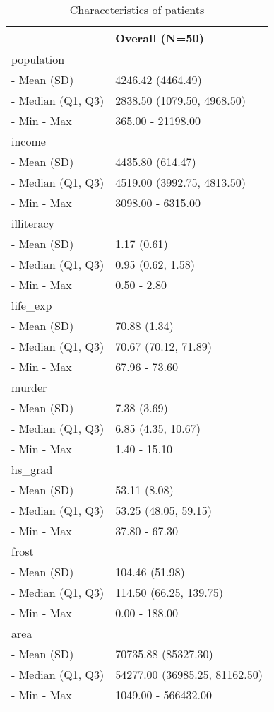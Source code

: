 \documentclass[]{article}
\begin{document}
\begin{table}[!h]

\caption{\label{tab:unnamed-chunk-2}Characcteristics of patients}
\centering
\begin{tabular}[t]{l|l}
\hline
 & Overall (N=50)\\
\hline
population & \\
\hline
-  Mean (SD) & 4246.42 (4464.49)\\
\hline
-  Median (Q1, Q3) & 2838.50 (1079.50, 4968.50)\\
\hline
-  Min - Max & 365.00 - 21198.00\\
\hline
income & \\
\hline
-  Mean (SD) & 4435.80 (614.47)\\
\hline
-  Median (Q1, Q3) & 4519.00 (3992.75, 4813.50)\\
\hline
-  Min - Max & 3098.00 - 6315.00\\
\hline
illiteracy & \\
\hline
-  Mean (SD) & 1.17 (0.61)\\
\hline
-  Median (Q1, Q3) & 0.95 (0.62, 1.58)\\
\hline
-  Min - Max & 0.50 - 2.80\\
\hline
life\_exp & \\
\hline
-  Mean (SD) & 70.88 (1.34)\\
\hline
-  Median (Q1, Q3) & 70.67 (70.12, 71.89)\\
\hline
-  Min - Max & 67.96 - 73.60\\
\hline
murder & \\
\hline
-  Mean (SD) & 7.38 (3.69)\\
\hline
-  Median (Q1, Q3) & 6.85 (4.35, 10.67)\\
\hline
-  Min - Max & 1.40 - 15.10\\
\hline
hs\_grad & \\
\hline
-  Mean (SD) & 53.11 (8.08)\\
\hline
-  Median (Q1, Q3) & 53.25 (48.05, 59.15)\\
\hline
-  Min - Max & 37.80 - 67.30\\
\hline
frost & \\
\hline
-  Mean (SD) & 104.46 (51.98)\\
\hline
-  Median (Q1, Q3) & 114.50 (66.25, 139.75)\\
\hline
-  Min - Max & 0.00 - 188.00\\
\hline
area & \\
\hline
-  Mean (SD) & 70735.88 (85327.30)\\
\hline
-  Median (Q1, Q3) & 54277.00 (36985.25, 81162.50)\\
\hline
-  Min - Max & 1049.00 - 566432.00\\
\hline
\end{tabular}
\end{table}
\end{document}
